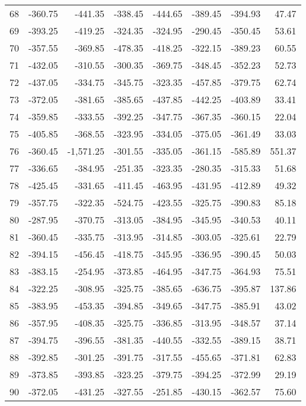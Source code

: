 \begin{longtable}{rrrrrrrr}
68 & -360.75 & -441.35 & -338.45 & -444.65 & -389.45 & -394.93 & 47.47  \\
69 & -393.25 & -419.25 & -324.35 & -324.95 & -290.45 & -350.45 & 53.61  \\
70 & -357.55 & -369.85 & -478.35 & -418.25 & -322.15 & -389.23 & 60.55  \\
71 & -432.05 & -310.55 & -300.35 & -369.75 & -348.45 & -352.23 & 52.73  \\
72 & -437.05 & -334.75 & -345.75 & -323.35 & -457.85 & -379.75 & 62.74  \\
73 & -372.05 & -381.65 & -385.65 & -437.85 & -442.25 & -403.89 & 33.41  \\
74 & -359.85 & -333.55 & -392.25 & -347.75 & -367.35 & -360.15 & 22.04  \\
75 & -405.85 & -368.55 & -323.95 & -334.05 & -375.05 & -361.49 & 33.03  \\
76 & -360.45 & -1,571.25 & -301.55 & -335.05 & -361.15 & -585.89 & 551.37  \\
77 & -336.65 & -384.95 & -251.35 & -323.35 & -280.35 & -315.33 & 51.68  \\
78 & -425.45 & -331.65 & -411.45 & -463.95 & -431.95 & -412.89 & 49.32  \\
79 & -357.75 & -322.35 & -524.75 & -423.55 & -325.75 & -390.83 & 85.18  \\
80 & -287.95 & -370.75 & -313.05 & -384.95 & -345.95 & -340.53 & 40.11  \\
81 & -360.45 & -335.75 & -313.95 & -314.85 & -303.05 & -325.61 & 22.79  \\
82 & -394.15 & -456.45 & -418.75 & -345.95 & -336.95 & -390.45 & 50.03  \\
83 & -383.15 & -254.95 & -373.85 & -464.95 & -347.75 & -364.93 & 75.51  \\
84 & -322.25 & -308.95 & -325.75 & -385.65 & -636.75 & -395.87 & 137.86  \\
85 & -383.95 & -453.35 & -394.85 & -349.65 & -347.75 & -385.91 & 43.02  \\
86 & -357.95 & -408.35 & -325.75 & -336.85 & -313.95 & -348.57 & 37.14  \\
87 & -394.75 & -396.55 & -381.35 & -440.55 & -332.55 & -389.15 & 38.71  \\
88 & -392.85 & -301.25 & -391.75 & -317.55 & -455.65 & -371.81 & 62.83  \\
89 & -373.85 & -393.85 & -323.25 & -379.75 & -394.25 & -372.99 & 29.19  \\
90 & -372.05 & -431.25 & -327.55 & -251.85 & -430.15 & -362.57 & 75.60  \\

\end{longtable}

